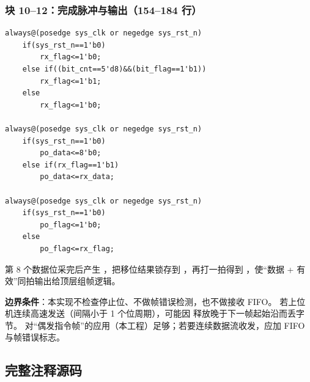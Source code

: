 \subsubsection{块 10--12：完成脉冲与输出（154--184 行）}

\begin{lstlisting}[style=vsnip]
always@(posedge sys_clk or negedge sys_rst_n)
    if(sys_rst_n==1'b0)
        rx_flag<=1'b0;
    else if((bit_cnt==5'd8)&&(bit_flag==1'b1))
        rx_flag<=1'b1;
    else
        rx_flag<=1'b0;

always@(posedge sys_clk or negedge sys_rst_n)
    if(sys_rst_n==1'b0)
        po_data<=8'b0;
    else if(rx_flag==1'b1)
        po_data<=rx_data;

always@(posedge sys_clk or negedge sys_rst_n)
    if(sys_rst_n==1'b0)
        po_flag<=1'b0;
    else
        po_flag<=rx_flag;
\end{lstlisting}

第 8 个数据位采完后产生 ，把移位结果锁存到 ，再打一拍得到
，使“数据 + 有效”同拍输出给顶层组帧逻辑。

\begin{warnbox}
\textbf{边界条件}：本实现不检查停止位、不做帧错误检测，也不做接收 FIFO。
若上位机连续高速发送（间隔小于 1 个位周期），可能因  释放晚于下一帧起始沿而丢字节。
对“偶发指令帧”的应用（本工程）足够；若要连续数据流收发，应加 FIFO 与帧错误标志。
\end{warnbox}

\subsection{完整注释源码}



